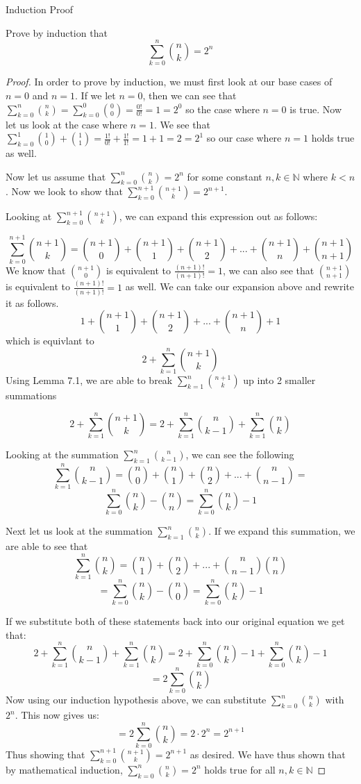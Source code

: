 Induction Proof

Prove by induction that \[ \sum_{k=0}^{n} {n \choose k}= 2^n \]

\begin{proof}
In order to prove by induction, we must first look at our base cases of $n = 0$ and $n = 1$.
If we let $n = 0$, then we can see that $\sum_{k=0}^{n} {n \choose k} = \sum_{k=0}^{0} {0 \choose 0} =\frac{0!}{0!} = 1 = 2^0$ so the case where $n = 0$ is true.
Now let us look at the case where $n = 1$. We see that $\sum_{k=0}^{1} {1 \choose 0}  + {1 \choose 1} = \frac{1!}{0!} + \frac{1!}{1!} = 1 + 1 = 2 = 2^1$ so our case where $n = 1$ holds true as well.

Now let us assume that $\sum_{k=0}^{n} {n \choose k}= 2^n$ for some constant $n,k \in \mathbb{N}$ where $k < n$. Now we look to show that $\sum_{k=0}^{n + 1} {n + 1 \choose k}= 2^{n+1}$.

Looking at $\sum_{k=0}^{n + 1} {n + 1 \choose k}$, we can expand this expression out as follows:

$$ \sum_{k=0}^{n + 1} {n + 1 \choose k} = {n + 1 \choose 0} + {n + 1 \choose 1} + {n + 1 \choose 2} + ... + {n + 1 \choose n} + {n + 1 \choose n + 1}$$
We know that ${n + 1 \choose 0}$ is equivalent to $\frac{(n + 1)!}{(n + 1)!} = 1$, we can also see that ${n + 1 \choose n + 1}$ is equivalent to $\frac{(n + 1)!}{(n + 1)!} = 1$ as well. We can take our expansion above and rewrite it as follows.
$$ 1 + {n + 1 \choose 1} + {n + 1 \choose 2} + ... + {n + 1 \choose n} + 1$$
which is equivlant to 
$$ 2 + \sum_{k=1}^{n} {n + 1 \choose k} $$
Using Lemma 7.1, we are able to break $\sum_{k=1}^{n} {n + 1 \choose k}$ up into 2 smaller summations

$$ 2 + \sum_{k=1}^{n} {n + 1 \choose k}  = 2 + \sum_{k=1}^{n} {n \choose k - 1} + \sum_{k=1}^{n} {n \choose k} $$

Looking at the summation $\sum_{k=1}^{n} {n \choose k - 1}$, we can see the following $$\sum_{k=1}^{n} {n \choose k - 1} = {n  \choose 0} + {n  \choose 1} + {n \choose 2} + ... + {n \choose n - 1} = $$ $$\sum_{k=0}^{n} {n \choose k} - {n \choose n} = \sum_{k=0}^{n} {n \choose k} - 1$$

Next let us look at the summation $\sum_{k=1}^{n} {n \choose k}$. If we expand this summation, we are able to see that $$\sum_{k=1}^{n} {n \choose k} =  {n  \choose 1} + {n \choose 2} + ... + {n \choose n - 1} {n  \choose n}$$
 $$= \sum_{k=0}^{n} {n \choose k} - {n \choose 0} = \sum_{k=0}^{n} {n \choose k} - 1$$
 
 If we substitute both of these statements back into our original equation we get that:
 $$ 2 + \sum_{k=1}^{n} {n \choose k - 1} + \sum_{k=1}^{n} {n \choose k} =  2 + \sum_{k=0}^{n} {n \choose k} - 1 +  \sum_{k=0}^{n} {n \choose k} - 1$$
 $$= 2 \sum_{k=0}^{n} {n \choose k}$$
 Now using our induction hypothesis above, we can substitute $\sum_{k=0}^{n} {n \choose k}$ with $2^n$. This now gives us:
  $$= 2 \sum_{k=0}^{n} {n \choose k} = 2\cdot2^n = 2 ^{n+1}$$ Thus showing that $\sum_{k=0}^{n + 1} {n + 1 \choose k}= 2^{n+1}$ as desired. We have thus shown that by mathematical induction, $\sum_{k=0}^{n} {n \choose k}= 2^n$ holds true for all $n,k\in \mathbb{N}$
\end{proof}

